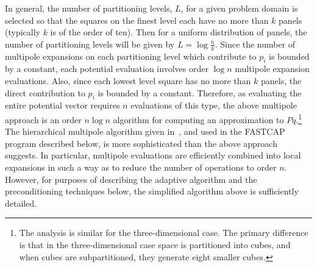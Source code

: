 In general, the number of partitioning levels, $ L $, for a given
problem domain is selected so that the squares on the finest level
each have no more than $ k $ panels (typically $ k$ is of the order of
ten).  Then for a uniform distribution of panels, the number of
partitioning levels will be given by $ L = \log{\frac{n}{k}} $.  Since
the number of multipole expansions on each partitioning level which
contribute to $ p_i $ is bounded by a constant, each potential
evaluation involves order $\log{n}$ multipole expansion evaluations.
Also, since each lowest level square has no more than $ k $ panels,
the direct contribution to $ p_i $ is bounded by a constant.
Therefore, as evaluating the entire potential vector requires $n$
evaluations of this type, the above multipole approach is an order
$n\log{n}$ algorithm for computing an approximation 
to $Pq$.\footnote{The analysis is similar
for the three-dimensional case. The primary difference is that in the
three-dimensional case space is partitioned into cubes, and when
cubes are subpartitioned, they generate eight smaller cubes.} The
hierarchical multipole algorithm given in~\cite{greeng88}, and used in
the FASTCAP program described below, is more sophisticated than the
above approach suggests. In particular, multipole evaluations are
efficiently combined into local expansions in such a way as to reduce
the number of operations to order $n$. However, for purposes of
describing the adaptive algorithm and the preconditioning techniques
below, the simplified algorithm above is sufficiently detailed.









